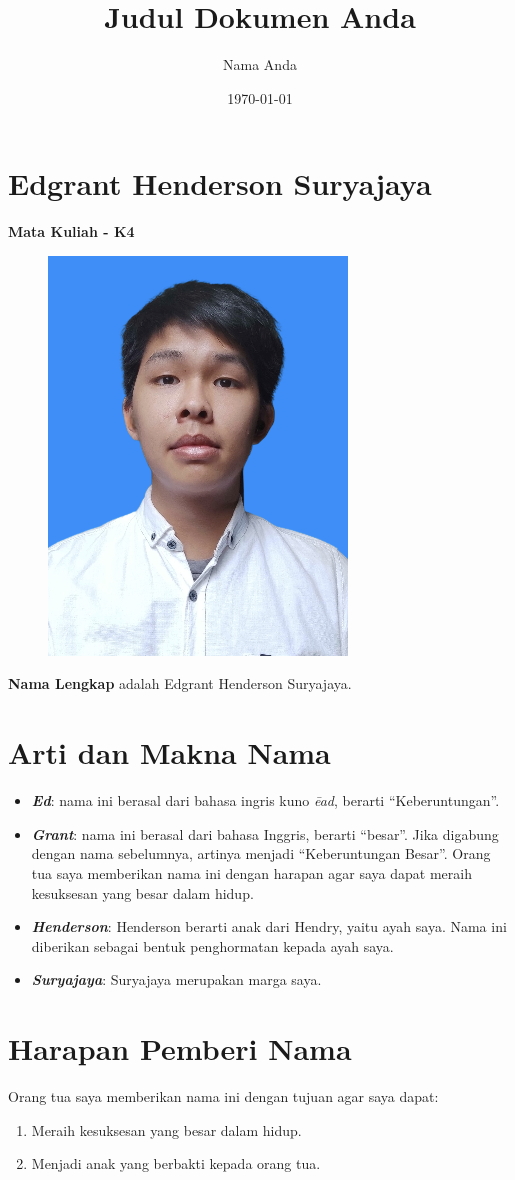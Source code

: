 \documentclass[a4paper]{article}
\title{Judul Dokumen Anda}
\author{Nama Anda}
\date{\today}
\begin{document}
\section*{Edgrant Henderson Suryajaya}
\textbf{\huge{Mata Kuliah - K4}} \\
\vspace{\baselineskip}

\begin{figure}[htp]
    \includegraphics[width=0.25\linewidth]{pasfoto.png}
    \label{fig:enter-label}
\end{figure}

\vspace{2em}

\noindent \textbf{Nama Lengkap} adalah Edgrant Henderson Suryajaya.

\section*{Arti dan Makna Nama}
\begin{itemize}
    \item \textbf{\textit{Ed}}: nama ini berasal dari bahasa ingris kuno \textit{ēad}, berarti ``Keberuntungan''.
    
    \item \textbf{\textit{Grant}}: nama ini berasal dari bahasa Inggris, berarti ``besar''. Jika digabung dengan nama sebelumnya, artinya menjadi ``Keberuntungan Besar''. Orang tua saya memberikan nama ini dengan harapan agar saya dapat meraih kesuksesan yang besar dalam hidup.

    \item \textbf{\textit{Henderson}}: Henderson berarti anak dari Hendry, yaitu ayah saya. Nama ini diberikan sebagai bentuk penghormatan kepada ayah saya.
    
    \item \textbf{\textit{Suryajaya}}: Suryajaya merupakan marga saya.
\end{itemize}

\section*{Harapan Pemberi Nama}
Orang tua saya memberikan nama ini dengan tujuan agar saya dapat:
\begin{enumerate}
    \item Meraih kesuksesan yang besar dalam hidup.
    \item Menjadi anak yang berbakti kepada orang tua.
\end{enumerate}
\end{document}
